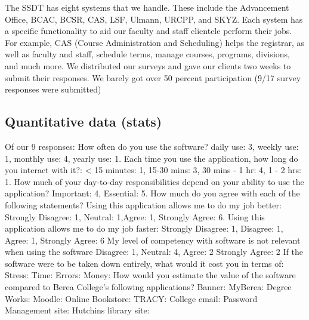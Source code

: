 The SSDT has eight systems that we handle. These include the Advancement Office, BCAC, BCSR, CAS, LSF, Ulmann, URCPP, and SKYZ. Each system has a specific functionality to aid our faculty and staff clientele perform their jobs. For example, CAS (Course Administration and Scheduling) helps the registrar, as well as faculty and staff, schedule terms, manage courses, programs, divisions, and much more.
We distributed our surveys and gave our clients two weeks to submit their responses. We barely got over 50 percent participation (9/17 survey responses were submitted)


\subsection{Quantitative data (stats)}
Of our 9 responses: %
How often do you use the software? daily use: 3, weekly use: 1, monthly use: 4, yearly use: 1.
Each time you use the  application, how long do you interact with it?: < 15 minutes: 1, 15-30 mins: 3, 30 mins - 1 hr: 4, 1 - 2 hrs: 1.
How much of your day-to-day responsibilities depend on your ability to use the  application? Important: 4, Essential: 5.
How much do you agree with each of the following statements?
Using this application allows me to do my job better: Strongly Disagree: 1, Neutral: 1,Agree: 1, Strongly Agree: 6.
Using this application allows me to do my job faster: Strongly Disagree: 1, Disagree: 1, Agree: 1, Strongly Agree: 6
My level of competency with software is not relevant when using the software Disagree: 1, Neutral: 4, Agree: 2 Strongly Agree: 2
If the software were to be taken down entirely, what would it cost you in terms of:
Stress:
Time:
Errors:
Money:
How would you estimate the value of the software compared to Berea College's following applications?
Banner:
MyBerea:
Degree Works:
Moodle:
Online Bookstore:
TRACY:
College email:
Password Management site:
Hutchins library site:
